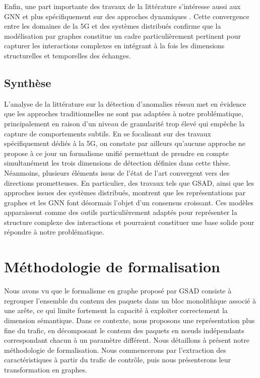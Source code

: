 \documentclass[a4paper,11pt,twoside]{StyleThese}
\begin{document}
Enfin, une part importante des travaux de la littérature s'intéresse aussi aux GNN \cite{dist_gnn1,dist_gnn2} et plus spécifiquement sur des approches dynamiques \cite{taddy}. Cette convergence entre les domaines de la 5G et des systèmes distribués confirme que la modélisation par graphes constitue un cadre particulièrement pertinent pour capturer les interactions complexes en intégrant à la fois les dimensions structurelles et temporelles des échanges. 

\subsection{Synthèse}
L’analyse de la littérature sur la détection d’anomalies réseau met en évidence que les approches traditionnelles ne sont pas adaptées à notre problématique, principalement en raison d’un niveau de granularité trop élevé qui empêche la capture de comportements subtils. En se focalisant sur des travaux spécifiquement dédiés à la 5G, on constate par ailleurs qu’aucune approche ne propose à ce jour un formalisme unifié permettant de prendre en compte simultanément les trois dimensions de détection définies dans cette thèse. Néanmoins, plusieurs éléments issus de l’état de l’art convergent vers des directions prometteuses. En particulier, des travaux tels que GSAD, ainsi que les approches issues des systèmes distribués, montrent que les représentations par graphes et les GNN font désormais l’objet d’un consensus croissant. Ces modèles apparaissent comme des outils particulièrement adaptés pour représenter la structure complexe des interactions et pourraient constituer une base solide pour répondre à notre problématique.

\section{Méthodologie de formalisation}
Nous avons vu que le formalisme en graphe proposé par GSAD consiste à regrouper l’ensemble du contenu des paquets dans un bloc monolithique associé à une arête, ce qui limite fortement la capacité à exploiter correctement la dimension sémantique. Dans ce contexte, nous proposons une représentation plus fine du trafic, en décomposant le contenu des paquets en nœuds indépendants correspondant chacun à un paramètre différent. Nous détaillons à présent notre méthodologie de formalisation. Nous commencerons par l’extraction des caractéristiques à partir du trafic de contrôle, puis nous présenterons leur transformation en graphes.
\end{document}
